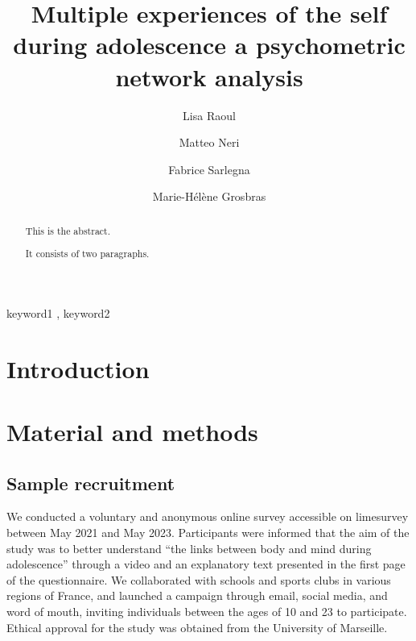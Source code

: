 \documentclass[preprint, 3p,
authoryear]{elsarticle} %
\begin{document}
\begin{frontmatter}

  \title{Multiple experiences of the self during adolescence a
psychometric network analysis}
    \author[LNC]{Lisa Raoul%
  }
    \author[INT]{Matteo Neri%
  }
    \author[INT]{Fabrice Sarlegna%
  }
    \author[LNC]{Marie-Hélène Grosbras%
  }
  
  \begin{abstract}
  This is the abstract.

  It consists of two paragraphs.
  \end{abstract}
    \begin{keyword}
    keyword1 \sep 
    keyword2
  \end{keyword}
  
 \end{frontmatter}

\hypertarget{introduction}{%
\section{Introduction}\label{introduction}}

\newpage

\hypertarget{material-and-methods}{%
\section{Material and methods}\label{material-and-methods}}

\hypertarget{sample-recruitment}{%
\subsection{Sample recruitment}\label{sample-recruitment}}

We conducted a voluntary and anonymous online survey accessible on
limesurvey between May 2021 and May 2023. Participants were informed
that the aim of the study was to better understand ``the links between
body and mind during adolescence'' through a video and an explanatory
text presented in the first page of the questionnaire. We collaborated
with schools and sports clubs in various regions of France, and launched
a campaign through email, social media, and word of mouth, inviting
individuals between the ages of 10 and 23 to participate. Ethical
approval for the study was obtained from the University of Marseille.
\end{document}
